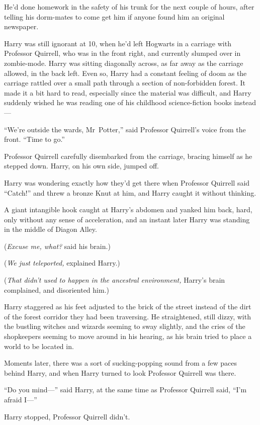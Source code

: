 He’d done homework in the safety of his trunk for the next couple of hours, after telling his dorm-mates to come get him if anyone found him an original newspaper.

Harry was still ignorant at 10\am, when he’d left Hogwarts in a carriage with Professor Quirrell, who was in the front right, and currently slumped over in zombie-mode. Harry was sitting diagonally across, as far away as the carriage allowed, in the back left. Even so, Harry had a constant feeling of doom as the carriage rattled over a small path through a section of non-forbidden forest. It made it a bit hard to read, especially since the material was difficult, and Harry suddenly wished he was reading one of his childhood science-fiction books instead—

“We’re outside the wards, Mr~Potter,” said Professor Quirrell’s voice from the front. “Time to go.”

Professor Quirrell carefully disembarked from the carriage, bracing himself as he stepped down. Harry, on his own side, jumped off.

Harry was wondering exactly how they’d get there when Professor Quirrell said “Catch!” and threw a bronze Knut at him, and Harry caught it without thinking.

A giant intangible hook caught at Harry’s abdomen and yanked him back, hard, only without any sense of acceleration, and an instant later Harry was standing in the middle of Diagon Alley.

(\emph{Excuse me, what?} said his brain.)

(\emph{We just teleported,} explained Harry.)

(\emph{That didn’t used to happen in the ancestral environment,} Harry’s brain complained, and disoriented him.)

Harry staggered as his feet adjusted to the brick of the street instead of the dirt of the forest corridor they had been traversing. He straightened, still dizzy, with the bustling witches and wizards seeming to sway slightly, and the cries of the shopkeepers seeming to move around in his hearing, as his brain tried to place a world to be located in.

Moments later, there was a sort of sucking-popping sound from a few paces behind Harry, and when Harry turned to look Professor Quirrell was there.

“Do you mind—” said Harry, at the same time as Professor Quirrell said, “I’m afraid I—”

Harry stopped, Professor Quirrell didn’t.

